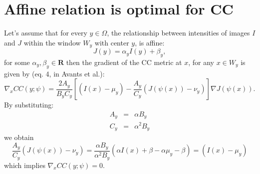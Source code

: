 \pagebreak
\section{Affine relation is optimal for CC}

Let's assume that for every $y \in \Omega$, the relationship between intensities of images $I$ and $J$ within the window $W_y$ with center $y$, is affine:
\begin{equation}
    J(y) = \alpha_{y} I(y) + \beta_{y},
\end{equation}
for some $\alpha_{y}, \beta_{y} \in \mathbf{R}$ then the gradient of the CC metric at $x$, for any $x\in W_{y}$ is given by (eq. 4, in Avants et al.\cite{Avants2008}):
\begin{equation}
    \nabla_{x} CC(y; \psi) = \frac{2A_{y}}{B_{y}C_{y}}\left[ (I(x) - \mu_{y}) - \frac{A_{y}}{C_{y}}\left(J(\psi(x)) - \nu_{y}\right)\right]\nabla J(\psi(x)).
\end{equation}
By substituting:
\begin{equation}
    \begin{array}{lll}
        A_{y} &=& \alpha B_{y}\\
        C_{y} &=& \alpha^{2}B_{y}
    \end{array}
\end{equation}
we obtain
\begin{equation}
    \frac{A_{y}}{C_{y}}\left(J(\psi(x)) - \nu_{y}\right) =
    \frac{\alpha B_{y}}{\alpha^{2}B_{y}}\left(\alpha I(x) + \beta - \alpha \mu_{y} - \beta \right) = (I(x) - \mu_{y})
\end{equation}
which implies $\nabla_{x} CC(y; \psi) = 0$.





